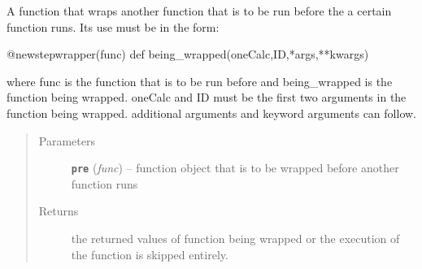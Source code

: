 \documentclass[letterpaper,10pt,english]{sphinxmanual}
\begin{document}
\begin{fulllineitems}
\label{prep:prep.newstepWrapper}
A function that wraps another function that is to be run before the
a certain function runs. Its use must be in the form:

@newstepwrapper(func)
def being\_wrapped(oneCalc,ID,*args,**kwargs)

where func is the function that is to be run before and being\_wrapped
is the function being wrapped. oneCalc and ID must be the first two
arguments in the function being wrapped. additional arguments and
keyword arguments can follow.
\begin{quote}\begin{description}
\item[{Parameters}] \leavevmode
\textbf{\texttt{pre}} (\emph{func}) -- function object that is to be wrapped before another function runs

\item[{Returns}] \leavevmode
the returned values of function being wrapped or the execution of the function
is skipped entirely.

\end{description}\end{quote}

\end{fulllineitems}

\end{document}
